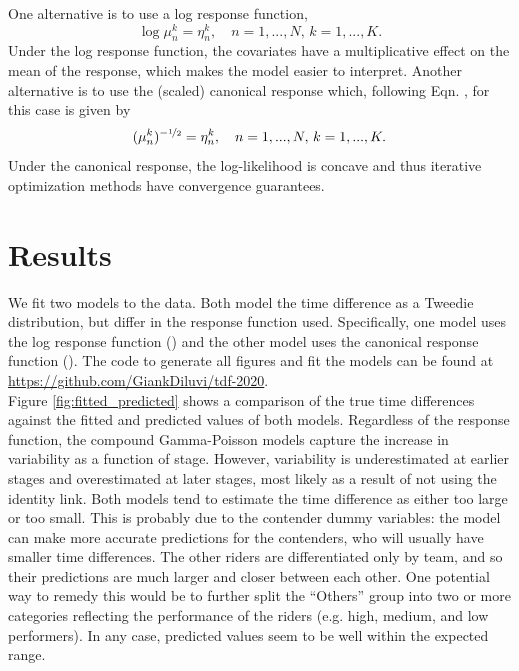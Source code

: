 \documentclass[aos,preprint]{imsart}
\begin{document}
One alternative is to use a log response function,
\[
  \log \mu_n^k = \eta_n^k, \quad n = 1, ..., N, \, k = 1, ..., K. \label{eq:log-response}
\]
Under the log response function, the covariates have a multiplicative effect on the mean of the response, which makes the model easier to interpret. Another alternative is to use the (scaled) canonical response which, following Eqn. , for this case is given by
\[
  (\mu_n^k)^{-\nicefrac{1}{2}} = \eta_n^k, \quad n = 1, ..., N, \, k = 1, ..., K. \label{eq:canonical-response}
\]
Under the canonical response, the log-likelihood is concave and thus iterative optimization methods have convergence guarantees.



\section{Results} \label{sec:results}


We fit two models to the data. Both model the time difference as a Tweedie distribution, but differ in the response function used. Specifically, one model uses the log response function () and the other model uses the canonical response function (). The code to generate all figures and fit the models can be found at \url{https://github.com/GiankDiluvi/tdf-2020}. \\


Figure \ref{fig:fitted_predicted} shows a comparison of the true time differences against the fitted and predicted values of both models. Regardless of the response function, the compound Gamma-Poisson models capture the increase in variability as a function of stage. However, variability is underestimated at earlier stages and overestimated at later stages, most likely as a result of not using the identity link. Both models tend to estimate the time difference as either too large or too small. This is probably due to the contender dummy variables: the model can make more accurate predictions for the contenders, who will usually have smaller time differences. The other riders are differentiated only by team, and so their predictions are much larger and closer between each other. One potential way to remedy this would be to further split the ``Others'' group into two or more categories reflecting the performance of the riders (e.g. high, medium, and low performers). In any case, predicted values seem to be well within the expected range. \\
\end{document}
